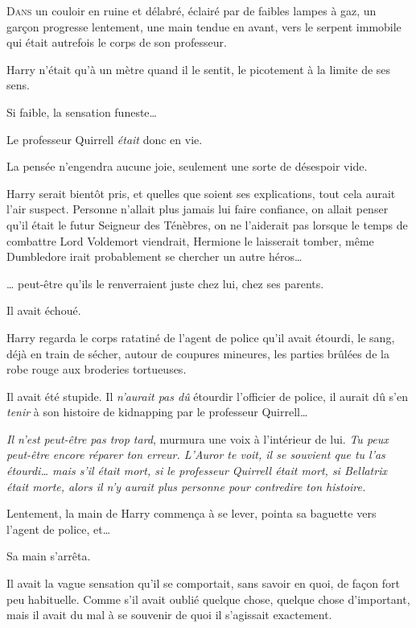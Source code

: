 
\lettrine{D}{ans} un couloir en ruine et délabré, éclairé par de faibles lampes à gaz, un garçon progresse lentement, une main tendue en avant, vers le serpent immobile qui était autrefois le corps de son professeur.

Harry n'était qu'à un mètre quand il le sentit, le picotement à la limite de ses sens.

Si faible, la sensation funeste…

Le professeur Quirrell \emph{était} donc en vie.

La pensée n'engendra aucune joie, seulement une sorte de désespoir vide.

Harry serait bientôt pris, et quelles que soient ses explications, tout cela aurait l'air suspect. Personne n'allait plus jamais lui faire confiance, on allait penser qu'il était le futur Seigneur des Ténèbres, on ne l'aiderait pas lorsque le temps de combattre Lord Voldemort viendrait, Hermione le laisserait tomber, même Dumbledore irait probablement se chercher un autre héros…

… peut-être qu'ils le renverraient juste chez lui, chez ses parents.

Il avait échoué.

Harry regarda le corps ratatiné de l'agent de police qu'il avait étourdi, le sang, déjà en train de sécher, autour de coupures mineures, les parties brûlées de la robe rouge aux broderies tortueuses.

Il avait été stupide. Il \emph{n'aurait pas dû} étourdir l'officier de police, il aurait dû s'en \emph{tenir} à son histoire de kidnapping par le professeur Quirrell…

\emph{Il n'est peut-être pas trop tard}, murmura une voix à l'intérieur de lui. \emph{Tu peux peut-être encore réparer ton erreur. L'Auror te voit, il se souvient que tu l'as étourdi… mais s'il était mort, si le professeur Quirrell était mort, si Bellatrix était morte, alors il n'y aurait plus personne pour contredire ton histoire.}

Lentement, la main de Harry commença à se lever, pointa sa baguette vers l'agent de police, et…

Sa main s'arrêta.

Il avait la vague sensation qu'il se comportait, sans savoir en quoi, de façon fort peu habituelle. Comme s'il avait oublié quelque chose, quelque chose d'important, mais il avait du mal à se souvenir de quoi il s'agissait exactement.

